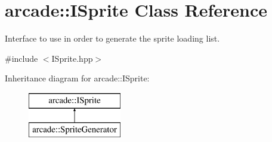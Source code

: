 \hypertarget{classarcade_1_1_i_sprite}{\section{arcade\-:\-:I\-Sprite Class Reference}
\label{classarcade_1_1_i_sprite}
}


Interface to use in order to generate the sprite loading list.  




{\ttfamily \#include $<$I\-Sprite.\-hpp$>$}

Inheritance diagram for arcade\-:\-:I\-Sprite\-:\begin{figure}[H]
\begin{center}
\leavevmode
\includegraphics[height=2.000000cm]{classarcade_1_1_i_sprite}
\end{center}
\end{figure}
